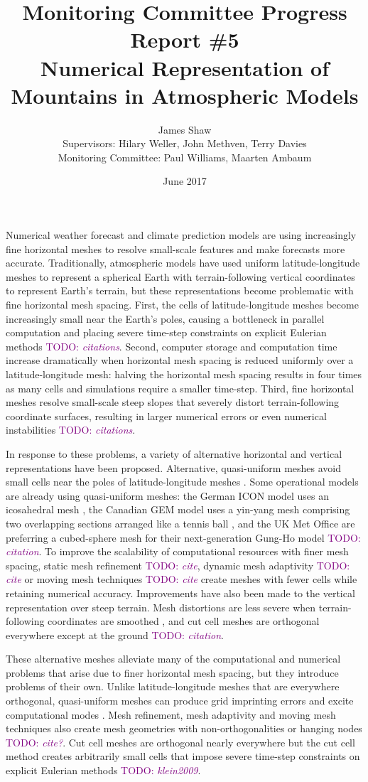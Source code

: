 \documentclass[a4paper,11pt]{article}
\title{
\vspace*{-2em}
Monitoring Committee Progress Report \#5\\
\vspace*{1em}
\Large{Numerical Representation of Mountains in Atmospheric Models}}
\author{James Shaw
\vspace{0.5em} \\
\large{Supervisors: Hilary Weller, John Methven, Terry Davies}
\vspace{0.5em} \\
\large{Monitoring Committee: Paul Williams, Maarten Ambaum}}
\date{June 2017}
\newcommand{\TODO}[1]{\textcolor{purple}{TODO: \emph{#1}}}
\begin{document}
\maketitle

Numerical weather forecast and climate prediction models are using increasingly fine horizontal meshes to resolve small-scale features and make forecasts more accurate.  Traditionally, atmospheric models have used uniform latitude-longitude meshes to represent a spherical Earth with terrain-following vertical coordinates to represent Earth's terrain, but these representations become problematic with fine horizontal mesh spacing.
First, the cells of latitude-longitude meshes become increasingly small near the Earth's poles, causing a bottleneck in parallel computation and placing severe time-step constraints on explicit Eulerian methods \TODO{citations}.
Second, computer storage and computation time increase dramatically when horizontal mesh spacing is reduced uniformly over a latitude-longitude mesh: halving the horizontal mesh spacing results in four times as many cells and simulations require a smaller time-step.
Third, fine horizontal meshes resolve small-scale steep slopes that severely distort terrain-following coordinate surfaces, resulting in larger numerical errors or even numerical instabilities \TODO{citations}.

In response to these problems, a variety of alternative horizontal and vertical representations have been proposed.  Alternative, quasi-uniform meshes avoid small cells near the poles of latitude-longitude meshes \citep{staniforth-thuburn2012}.  Some operational models are already using quasi-uniform meshes: the German ICON model uses an icosahedral mesh \citep{wan2013}, the Canadian GEM model uses a yin-yang mesh comprising two overlapping sections arranged like a tennis ball \citep{qaddouri2011}, and the UK Met Office are preferring a cubed-sphere mesh for their next-generation Gung-Ho model \TODO{citation}.
To improve the scalability of computational resources with finer mesh spacing, static mesh refinement \TODO{cite}, dynamic mesh adaptivity \TODO{cite} or moving mesh techniques \TODO{cite} create meshes with fewer cells while retaining numerical accuracy.
Improvements have also been made to the vertical representation over steep terrain.  Mesh distortions are less severe when terrain-following coordinates are smoothed \citep{leuenberger2010,klemp2011}, and cut cell meshes are orthogonal everywhere except at the ground \TODO{citation}.

These alternative meshes alleviate many of the computational and numerical problems that arise due to finer horizontal mesh spacing, but they introduce problems of their own.
Unlike latitude-longitude meshes that are everywhere orthogonal, quasi-uniform meshes can produce grid imprinting errors and excite computational modes \citep{weller2012}.
Mesh refinement, mesh adaptivity and moving mesh techniques also create mesh geometries with non-orthogonalities or hanging nodes \TODO{cite?}.
Cut cell meshes are orthogonal nearly everywhere but the cut cell method creates arbitrarily small cells that impose severe time-step constraints on explicit Eulerian methods \TODO{klein2009}.
\end{document}
